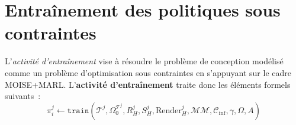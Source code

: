 \begin{enumerate*}[label=\arabic*),itemjoin={;\quad}]

\end{enumerate*}


\clearpage
\thispagestyle{empty}
\null
\newpage

\chapter{Entraînement des politiques sous contraintes}
\label{chap:training}


L'\textit{activité d'entraînement} vise à résoudre le problème de conception modélisé comme un problème d'optimisation sous contraintes en s'appuyant sur le cadre MOISE+MARL. L'\textbf{activité d'entraînement} traite donc les éléments formels suivants~:
%
\begin{displaymath}
  \pi^j_i \gets \texttt{train}(\mathcal{T}^j, \Omega^{\mathcal{T}^j}_0, R^j_H, S^j_H, \text{Render}^j_H, \mathcal{MM}, \mathcal{C}_{\text{inf}}, \gamma, \Omega, A)
\end{displaymath}

